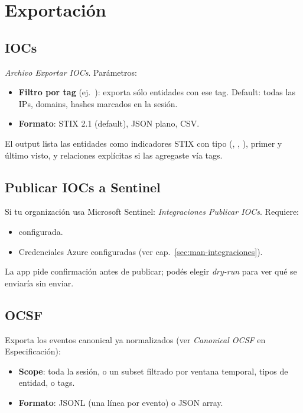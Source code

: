 \chapter{Exportación}
\label{sec:man-export}

\section{IOCs}

\emph{Archivo \textrightarrow{} Exportar \textrightarrow{} IOCs}.
Parámetros:

\begin{itemize}
    \item \textbf{Filtro por tag} (ej.\ ): exporta sólo
    entidades con ese tag. Default: todas las IPs, domains, hashes
    marcados en la sesión.
    \item \textbf{Formato}: STIX 2.1 (default), JSON plano, CSV.
\end{itemize}

El output lista las entidades como indicadores STIX con tipo
(, , ),
primer y último visto, y relaciones explícitas si las agregaste
vía tags.

\section{Publicar IOCs a Sentinel}

Si tu organización usa Microsoft Sentinel:
\emph{Integraciones \textrightarrow{} Publicar IOCs}. Requiere:

\begin{itemize}
    \item {} configurada.
    \item Credenciales Azure configuradas (ver
    cap.~\ref{sec:man-integraciones}).
\end{itemize}

La app pide confirmación antes de publicar; podés elegir
\emph{dry-run} para ver qué se enviaría sin enviar.

\section{OCSF}

Exporta los eventos canonical ya normalizados (ver \emph{Canonical
OCSF} en Especificación):

\begin{itemize}
    \item \textbf{Scope}: toda la sesión, o un subset filtrado por
    ventana temporal, tipos de entidad, o tags.
    \item \textbf{Formato}: JSONL (una línea por evento) o JSON
    array.
\end{itemize}

